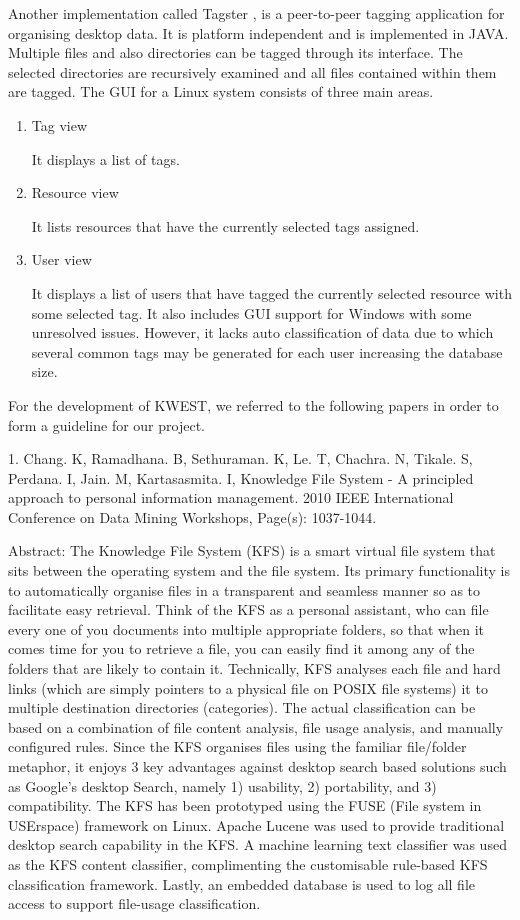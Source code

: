 Another implementation called Tagster\cite{TAGSTER} , is a peer-to-peer tagging application for
organising desktop data. It is platform independent and is implemented in JAVA. Multiple
files and also directories can be tagged through its interface. The selected directories are
recursively examined and all files contained within them are tagged. The GUI for a Linux
system consists of three main areas.

\begin{enumerate}
 \item Tag view 
 
 It displays a list of tags.
  
\item Resource view 

 It lists resources that have the currently selected tags assigned.
\item User view

 It displays a list of users that have tagged the currently selected resource
with some selected tag. It also includes GUI support for Windows with some unresolved
issues. However, it lacks auto classification of data due to which several common tags
may be generated for each user increasing the database size.

 \end{enumerate} 
\newpage For the development of KWEST, we referred to the following papers in order to
form a guideline for our project.

1. Chang. K, Ramadhana. B, Sethuraman. K, Le. T, Chachra. N, Tikale. S, Perdana. I,
Jain. M, Kartasasmita. I, Knowledge File System - A principled approach to personal
information management. 2010 IEEE International Conference on Data Mining
Workshops, Page(s): 1037-1044.\cite{KFS}

Abstract: The Knowledge File System (KFS) is a smart virtual file system that
sits between the operating system and the file system. Its primary functionality is to
automatically organise files in a transparent and seamless manner so as to facilitate
easy retrieval. Think of the KFS as a personal assistant, who can file every one of you
documents into multiple appropriate folders, so that when it comes time for you to
retrieve a file, you can easily find it among any of the folders that are likely to contain
it. Technically, KFS analyses each file and hard links (which are simply pointers to a
physical file on POSIX file systems) it to multiple destination directories (categories).
The actual classification can be based on a combination of file content analysis, file usage
analysis, and manually configured rules. Since the KFS organises files using the familiar
file/folder metaphor, it enjoys 3 key advantages against desktop search based solutions
such as Google's desktop Search, namely 1) usability, 2) portability, and 3) compatibility.
The KFS has been prototyped using the FUSE (File system in USErspace) framework
on Linux. Apache Lucene was used to provide traditional desktop search capability
		in the KFS. A machine learning text classifier was used as the KFS content classifier,
		complimenting the customisable rule-based KFS classification framework. Lastly, an
		embedded database is used to log all file access to support file-usage classification.
		
